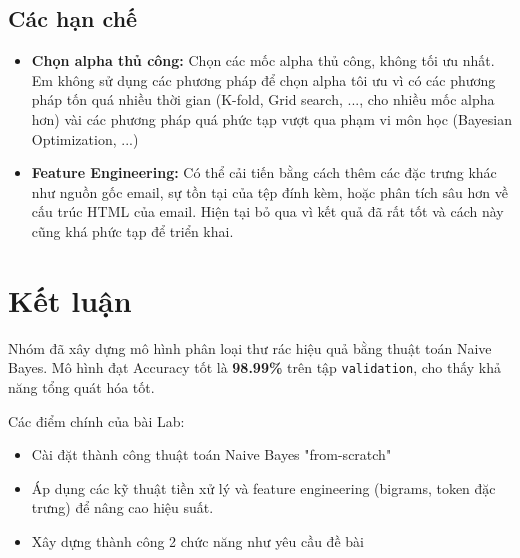 \subsection{Các hạn chế}
\begin{itemize}
    \item \textbf{Chọn alpha thủ công:} Chọn các mốc alpha thủ công, không tối ưu nhất. Em không sử dụng các phương pháp để chọn alpha tôi ưu vì có các phương pháp tốn quá nhiều thời gian (K-fold, Grid search, ..., cho nhiều mốc alpha hơn) vài các phương pháp quá phức tạp vượt qua phạm vi môn học (Bayesian Optimization, ...)
    \item \textbf{Feature Engineering:} Có thể cải tiến bằng cách thêm các đặc trưng khác như nguồn gốc email, sự tồn tại của tệp đính kèm, hoặc phân tích sâu hơn về cấu trúc HTML của email. Hiện tại bỏ qua vì kết quả đã rất tốt và cách này cũng khá phức tạp để triển khai.
\end{itemize}

\section{Kết luận}
 Nhóm đã xây dựng mô hình phân loại thư rác hiệu quả bằng thuật toán Naive Bayes. Mô hình đạt Accuracy tốt là \textbf{98.99\%} trên tập \texttt{validation}, cho thấy khả năng tổng quát hóa tốt.

Các điểm chính của bài Lab:
\begin{itemize}
    \item Cài đặt thành công thuật toán Naive Bayes "from-scratch"
    \item Áp dụng các kỹ thuật tiền xử lý và feature engineering (bigrams, token đặc trưng) để nâng cao hiệu suất.
    \item Xây dựng thành công 2 chức năng như yêu cầu đề bài
\end{itemize}